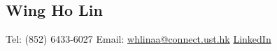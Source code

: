 \documentclass[10pt, oneside]{article}
\begin{document}
%	
\begin{center}
\section*{Wing Ho Lin}
\begin{comment}
\begin{tabular}{p{2.1cm}l}	
	\toprule
	Telephone: & +852 64336027\\
	Email: & \href{mailto:whlinaa@cse.ust.hk}
	{whlinaa@cse.ust.hk}
\end{tabular}	
\end{comment}
Tel: (852) 6433-6027 \qquad Email: \href{mailto:whlinaa@connect.ust.hk}{whlinaa@connect.ust.hk} \qquad \href{https://www.linkedin.com/in/wing-ho-lin-5b5226110/}{LinkedIn}

\end{center}
\vspace{-0.4cm}
\end{document}
